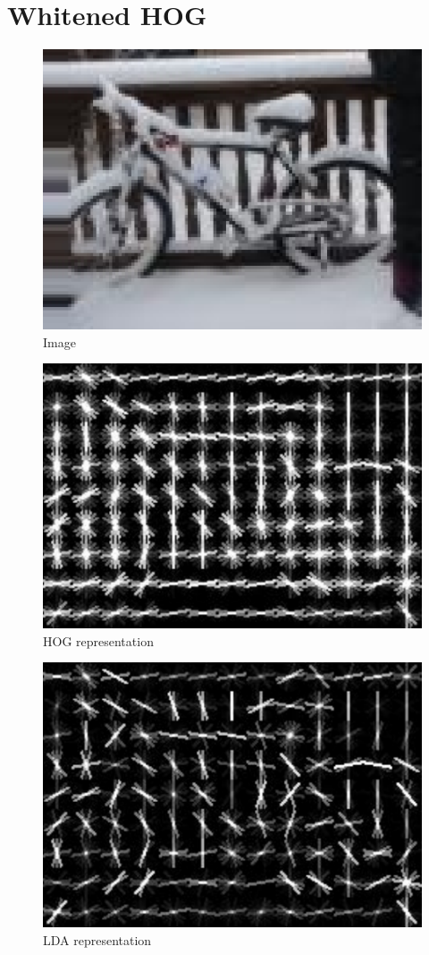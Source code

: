 \section{Whitened \ac{HOG}}
\label{sec:whitened_hog}

\begin{figure}
\centering
\includegraphics[width=0.7\linewidth]{images/whitened_hog_image}
\caption[Image]{Image}
\label{fig:whitened_hog_image}
\end{figure}
\begin{figure}
\centering
\includegraphics[width=0.7\linewidth]{images/whitened_hog_hog}
\caption[HOG representation]{HOG representation}
\label{fig:whitened_hog_hog}
\end{figure}
\begin{figure}
\centering
\includegraphics[width=0.7\linewidth]{images/whitened_hog_lda}
\caption[LDA representation]{LDA representation}
\label{fig:whitened_hog_lda}
\end{figure}
